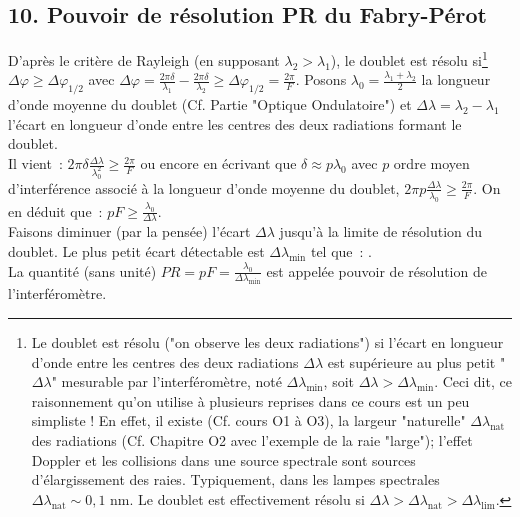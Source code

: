 \documentclass{article}
\newcommand{\mathcolorbox}[2]{\fcolorbox{black}{#1}{$#2$}}
\begin{document}
\subsection*{10.  Pouvoir de résolution PR du Fabry-Pérot}
D'après le critère de Rayleigh (en supposant $\lambda_{2} >
\lambda_{1}$), le doublet est résolu si\footnote{Le doublet est
résolu ("on observe les deux radiations") si l'écart en longueur
d'onde entre les centres des deux radiations $\Delta \lambda$ est
supérieure au plus petit "$\Delta \lambda$" mesurable par
l'interféromètre, noté $\Delta \lambda_{\mathrm{min}}$, soit $\Delta \lambda
> \Delta \lambda_{\mathrm{min}}$. Ceci dit, ce raisonnement qu'on utilise à
plusieurs reprises dans ce cours est un peu simpliste ! En effet, il
existe (Cf. cours O1 à O3), la largeur "naturelle" $\Delta
\lambda_{\mathrm{nat}}$ des radiations (Cf. Chapitre O2 avec l'exemple de la
raie "large"); l'effet Doppler et les collisions dans une source
spectrale sont sources d'élargissement des raies. Typiquement, dans
les lampes spectrales $\Delta \lambda_{\mathrm{nat}} \sim 0,1$ nm. Le doublet
est effectivement résolu si $\Delta \lambda > \Delta \lambda_{\mathrm{nat}} >
\Delta \lambda_{\mathrm{lim}}$.} $\Delta \varphi \geq \Delta \varphi_{\mathrm{1/2}}$
avec $\Delta \varphi = \frac{2\pi \delta}{\lambda_{1}} - \frac{2\pi
\delta}{\lambda_{2}} \geq \Delta \varphi_{\mathrm{1/2}} = \frac{2\pi}{F}$.
Posons $\lambda_{0} = \frac{\lambda_{1}+\lambda_{2}}{2}$ la longueur
d'onde moyenne du doublet (Cf. Partie "Optique Ondulatoire") et
$\Delta \lambda = \lambda_{2}-\lambda_{1}$ l'écart en longueur
d'onde entre les
centres des deux radiations formant le doublet. \\
Il vient : $2\pi\delta \frac{\Delta \lambda}{\lambda_{0}^{2}} \geq
\frac{2\pi}{F}$ ou encore en écrivant que $\delta \approx
p\lambda_{0}$ avec $p$ ordre moyen d'interférence associé à la
longueur d'onde moyenne du doublet, $2\pi p \frac{\Delta
\lambda}{\lambda_{0}} \geq \frac{2\pi}{F}$. On en déduit que : $pF
\geq \frac{\lambda_{0}}{\Delta \lambda}$. \\
Faisons diminuer (par la pensée) l'écart $\Delta \lambda$ jusqu'à la
limite de résolution du doublet. Le plus petit écart détectable est
$\Delta \lambda_{\mathrm{min}}$ tel que : \mathcolorbox{gray!20}{pF =
\frac{\lambda_{0}}{\Delta \lambda_{\mathrm{min}}}}. \\
La quantité (sans unité) $PR = pF = \frac{\lambda_{0}}{\Delta
\lambda_{\mathrm{min}}}$ est appelée pouvoir de résolution de
l'interféromètre.
\end{document}
